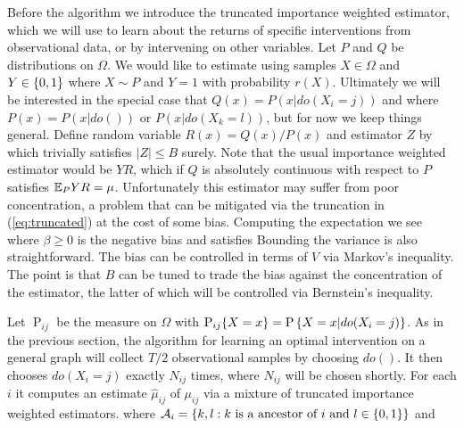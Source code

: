 Before the algorithm we introduce the truncated importance weighted estimator, which we will use to learn about the returns of 
specific interventions from observational data, or by intervening on other variables. Let $P$ and $Q$ be distributions on $\Omega$.
We would like to estimate
using samples $X \in \Omega$ and $Y \in \left\{0,1\right\}$ where $X \sim P$ and $Y = 1$ with probability $r(X)$. Ultimately we will be interested
in the special case that $Q(x) = P(x|do(X_i = j))$ and where $P(x) = P(x|do())$ or $P(x|do(X_k = l))$, but for now we keep things general.
Define random variable $R(x) = Q(x)/P(x)$ and estimator $Z$ by
which trivially satisfies $|Z| \leq B$ surely.
Note that the usual importance weighted estimator would be $YR$, which if $Q$ is absolutely continuous with respect to $P$ satisfies $\mathbb E_P YR = \mu$. Unfortunately
this estimator may suffer from poor concentration, a problem that can be mitigated via the truncation in (\ref{eq:truncated}) at the cost of some bias.
Computing the expectation we see
where $\beta \geq 0$ is the negative bias and satisfies
Bounding the variance is also straightforward.
The bias can be controlled in terms of $V$ via Markov's inequality.
The point is that $B$ can be tuned to trade the bias against the concentration of the estimator,
the latter of which will be controlled via Bernstein's inequality. 

Let $\operatorname P_{ij}$ be the measure on $\Omega$ with $\operatorname{P}_{ij}\!\left\{X = x\right\} = \operatorname{P}\left\{X = x|do(X_i = j)\right\}$.
As in the previous section, the algorithm for learning an optimal intervention on a general graph will 
collect $T/2$ observational samples by choosing $do()$. It then chooses $do(X_i = j)$ 
exactly $N_{ij}$ times, where $N_{ij}$ will be chosen shortly. For each $i$ it computes an estimate $\hat \mu_{ij}$ of $\mu_{ij}$ via
a mixture of truncated importance weighted estimators.
where $\mathcal A_i = \left\{k, l : k \text{ is a ancestor of } i \text{ and } l \in \left\{0,1\right\}\right\}$ and

